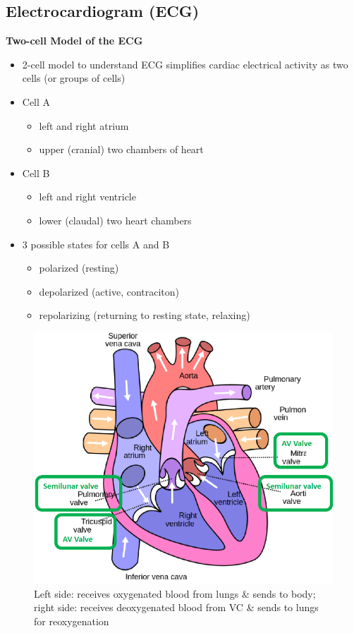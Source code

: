 \documentclass[11pt,fleqn]{book} %
\begin{document}
\subsection{Electrocardiogram (ECG)}
\textbf{Two-cell Model of the ECG}
\begin{itemize}
    \item 2-cell model to
understand ECG
simplifies cardiac
electrical activity
as two cells (or
groups of cells)
    \item Cell A
    \begin{itemize}
        \item left and right atrium
        \item upper (cranial) two chambers of heart
    \end{itemize}
    \item Cell B
    \begin{itemize}
        \item left and right ventricle
        \item lower (claudal) two heart chambers
    \end{itemize}
    \item 3 possible states for cells A and B
    \begin{itemize}
        \item polarized (resting)
        \item depolarized (active, contraciton)
        \item repolarizing (returning to resting state, relaxing)
    \end{itemize}
\end{itemize}

\begin{figure}[h!]
\begin{center}
    \includegraphics[width=0.5\linewidth]{Pictures/Screenshot 2024-04-03 233656.png}
    \caption{Left side: receives oxygenated
blood from lungs \& sends to body; right side: receives deoxygenated
blood from VC \& sends to lungs
for reoxygenation}
\end{center}
\end{figure}
\end{document}
